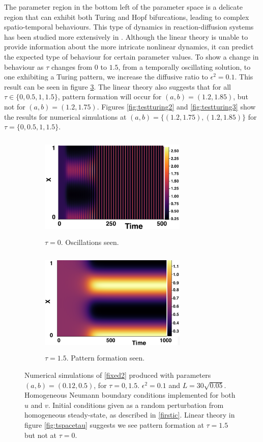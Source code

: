 The parameter region in the bottom left of the parameter space is a delicate region that can exhibit both Turing and Hopf bifurcations, leading to complex spatio-temporal behaviours. This type of dynamics in reaction-diffusion systems has been studied more extensively in \cite{krausefixed,jiang}. Although the linear theory is unable to provide information about the more intricate nonlinear dynamics, it can predict the expected type of behaviour for certain parameter values. To show a change in behaviour as $\tau$ changes from $0$ to $1.5$, from a temporally oscillating solution, to one exhibiting a Turing pattern, we increase the diffusive ratio to $\epsilon^2=0.1$. This result can be seen in figure \ref{fig:testturing}. The linear theory also suggests that for all $\tau\in\{0,0.5,1,1.5\}$, pattern formation will occur for $(a,b)=(1.2,1.85)$, but not for $(a,b)=(1.2,1.75)$. Figures \ref{fig:testturing2} and \ref{fig:testturing3} show the results for numerical simulations at $(a,b)=\{(1.2,1.75),(1.2,1.85)\}$ for $\tau=\{0,0.5,1,1.5\}$.
\begin{figure}[h]
    \centering
    \begin{subfigure}[b]{0.45\textwidth}
        \centering
        \includegraphics[width=7cm,height=5cm]{toscill.png}
        \caption{$\tau=0$. Oscillations seen.}
        \label{}
    \end{subfigure}
    \hfill
    \begin{subfigure}[b]{0.45\textwidth}
        \centering
        \includegraphics[width=7cm,height=5cm]{tpattpred.png}
        \caption{$\tau=1.5$. Pattern formation seen.}
        \label{}
    \end{subfigure}
    \caption{Numerical simulations of \eqref{fixed2} produced with parameters $(a,b)=(0.12,0.5)$, for $\tau=0,1.5$. $\epsilon^2=0.1$ and $L=30\sqrt{0.05}$. Homogeneous Neumann boundary conditions implemented for both $u$ and $v$. Initial conditions given as a random perturbation from homogeneous steady-state, as described in \eqref{firstic}. Linear theory in figure \ref{fig:tspacetau} suggests we see pattern formation at $\tau=1.5$ but not at $\tau=0$.}
    \label{fig:testturing}
\end{figure}


